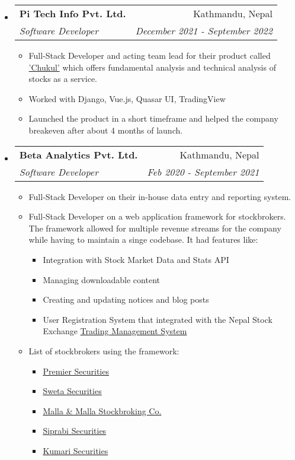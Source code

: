 \documentclass[letterpaper,11pt]{article}
\makeatletter
\newcommand{\cvsubheading}[4]{
\begin{tabular*}{6.5in}{l@{\cftdotfill{\cftsecdotsep}\extracolsep{\fill}}r}
        \textbf{#1} & #2 \\
        \textit{#3} & \textit{#4} \\
\end{tabular*}\vspace{-6pt}}
\newcommand{\cvitem}[1]{\item #1 \vspace{-2pt}}
\makeatother
\begin{document}
\begin{itemize}
      \item
            \cvsubheading{Pi Tech Info Pvt. Ltd.}{Kathmandu, Nepal}{Software Developer}{December 2021 - September 2022}
            \begin{itemize}
                  \cvitem{Full-Stack Developer and acting team lead for their product called \href{https://chukul.com}{'Chukul'} which offers fundamental analysis and technical analysis of stocks as a service.}
                  \cvitem{Worked with Django, Vue.js, Quasar UI, TradingView}
                  \cvitem{Launched the product in a short timeframe and helped the company breakeven after about 4 months of launch.}
            \end{itemize}

      \item
            \cvsubheading{Beta Analytics Pvt. Ltd.}{Kathmandu, Nepal}{Software Developer}{Feb 2020 - September 2021}
            \begin{itemize}
                  \cvitem{Full-Stack Developer on their in-house data entry and reporting system.}
                  \cvitem{
                        Full-Stack Developer on a web application framework for stockbrokers. The framework allowed for multiple revenue streams for the company while having to maintain a singe codebase. It had features like:
                        \begin{itemize}
                              \item Integration with Stock Market Data and Stats API
                              \item Managing downloadable content
                              \item Creating and updating notices and blog posts
                              \item User Registration System that integrated with the Nepal Stock Exchange \href{https://tms01.nepsetms.com.np/}{Trading Management System}
                        \end{itemize}
                  }
                  \cvitem{
                        List of stockbrokers using the framework:
                        \begin{itemize}
                              \item \href{https://www.premiersecurities.com.np/}{Premier Securities}
                              \item \href{https://www.swetasecurities.com/}{Sweta Securities}
                              \item \href{https://mallastock.com/}{Malla \& Malla Stockbroking Co.}
                              \item \href{https://siprabi.com/}{Siprabi Securities}
                              \item \href{https://kumarisecurities.com/}{Kumari Securities}
                        \end{itemize}
                  }


\end{itemize}
\end{itemize}
\end{document}
